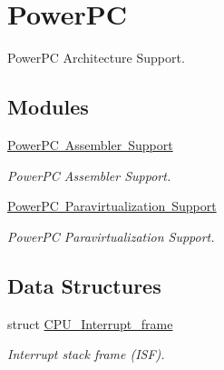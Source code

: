 \hypertarget{group__RTEMSScoreCPUPowerPC}{}\section{Power\+PC}
\label{group__RTEMSScoreCPUPowerPC}


Power\+PC Architecture Support.  


\subsection*{Modules}
\begin{DoxyCompactItemize}
\item 
\mbox{\hyperlink{group__RTEMSScoreCPUPowerPCASM}{Power\+P\+C Assembler Support}}
\begin{DoxyCompactList}\small\item\em Power\+PC Assembler Support. \end{DoxyCompactList}\item 
\mbox{\hyperlink{group__RTEMSScoreCPUPowerPCParavirt}{Power\+P\+C Paravirtualization Support}}
\begin{DoxyCompactList}\small\item\em Power\+PC Paravirtualization Support. \end{DoxyCompactList}\end{DoxyCompactItemize}
\subsection*{Data Structures}
\begin{DoxyCompactItemize}
\item 
struct \mbox{\hyperlink{structCPU__Interrupt__frame}{C\+P\+U\+\_\+\+Interrupt\+\_\+frame}}
\begin{DoxyCompactList}\small\item\em Interrupt stack frame (I\+SF). \end{DoxyCompactList}\end{DoxyCompactItemize}
